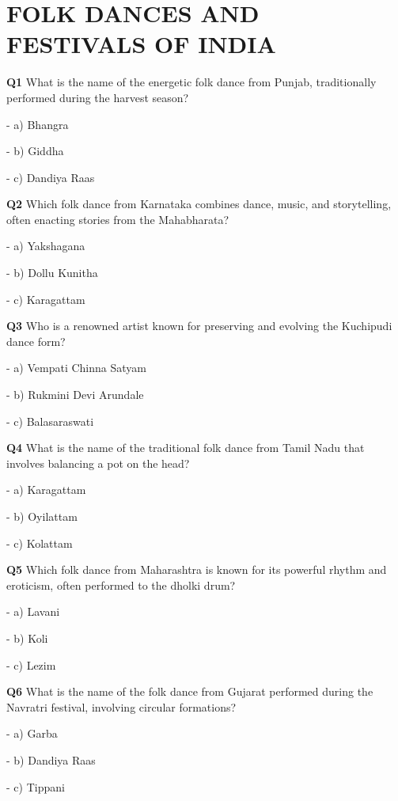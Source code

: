\section{FOLK DANCES AND FESTIVALS OF INDIA}

\textbf{Q1} What is the name of the energetic folk dance from Punjab, traditionally performed during the harvest season?\par
\quad - a) Bhangra\par
\quad - b) Giddha\par
\quad - c) Dandiya Raas\par

\textbf{Q2} Which folk dance from Karnataka combines dance, music, and storytelling, often enacting stories from the Mahabharata?\par
\quad - a) Yakshagana\par
\quad - b) Dollu Kunitha\par
\quad - c) Karagattam\par

\textbf{Q3} Who is a renowned artist known for preserving and evolving the Kuchipudi dance form?\par
\quad - a) Vempati Chinna Satyam\par
\quad - b) Rukmini Devi Arundale\par
\quad - c) Balasaraswati\par

\textbf{Q4} What is the name of the traditional folk dance from Tamil Nadu that involves balancing a pot on the head?\par
\quad - a) Karagattam\par
\quad - b) Oyilattam\par
\quad - c) Kolattam\par

\textbf{Q5} Which folk dance from Maharashtra is known for its powerful rhythm and eroticism, often performed to the dholki drum?\par
\quad - a) Lavani\par
\quad - b) Koli\par
\quad - c) Lezim\par

\textbf{Q6} What is the name of the folk dance from Gujarat performed during the Navratri festival, involving circular formations?\par
\quad - a) Garba\par
\quad - b) Dandiya Raas\par
\quad - c) Tippani\par

